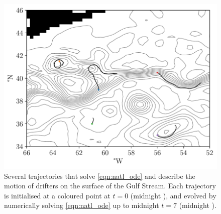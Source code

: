 \begin{figure}
	\centering
	\includegraphics[width=\textwidth]{chp06_applications/figures/gulf_stream/det_trajs}
	\caption{Several trajectories that solve \cref{eqn:natl_ode} and describe the motion of drifters on the surface of the Gulf Stream.
		Each trajectory is initialised at a coloured point at \(t = 0\) (midnight ), and evolved by numerically solving \cref{eqn:natl_ode} up to midnight \(t = 7\) (midnight ).}
	\label{fig:natl_ode_sols}
\end{figure}

